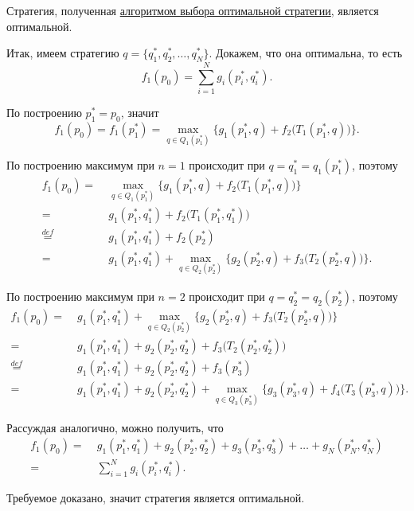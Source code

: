\fact

Стратегия, полученная \hyperref[def:opt_strategy]{алгоритмом выбора оптимальной стратегии}, является оптимальной.

\prooof


Итак, имеем стратегию $q = \{q_1^*, q_2^*, \dots, q_N^*\}$. Докажем, что она оптимальна, то есть
\[
f_1(p_0) = \sum_{i=1}^N g_i(p_i^*, q_i^*).
\]

По построению $p_1^* = p_0$, значит
\[
f_1(p_0) = f_1(p_1^*) = \max_{q \in Q_{1}(p_1^*)} \Big\{g_1(p_1^*, q) + f_{2}\big(T_{1}(p_1^*, q)\big)\Big\}.
\]

По построению максимум при $n=1$ происходит при $q = q_1^* = q_1(p_1^*)$, поэтому
\begin{align*}
	f_1(p_0) =& \; \max_{q \in Q_{1}(p_1^*)} \Big\{g_1(p_1^*, q) + f_{2}\big(T_{1}(p_1^*, q)\big)\Big\} \\
	=& \; g_1(p_1^*, q_1^*) + f_{2}\big(T_{1}(p_1^*, q_1^*)\big) \\
	\stackrel{def}{=}& \; g_1(p_1^*, q_1^*) + f_2(p_2^*) \\
	=& \; g_1(p_1^*, q_1^*) + \max_{q \in Q_{2}(p_2^*)} \Big\{g_2(p_2^*, q) + f_{3}\big(T_{2}(p_2^*, q)\big)\Big\}.
\end{align*}

По построению максимум при $n=2$ происходит при $q = q_2^* = q_2(p_2^*)$, поэтому
\begin{align*}
	f_1(p_0) =& \; g_1(p_1^*, q_1^*) + \max_{q \in Q_{2}(p_2^*)} \Big\{g_2(p_2^*, q) + f_{3}\big(T_{2}(p_2^*, q)\big)\Big\} \\
	=& \; g_1(p_1^*, q_1^*) + g_2(p_2^*, q_2^*) + f_{3}\big(T_{2}(p_2^*, q_2^*)\big) \\
	\stackrel{def}{=}& \; g_1(p_1^*, q_1^*) + g_2(p_2^*, q_2^*) + f_3(p_3^*) \\
	=& \; g_1(p_1^*, q_1^*) + g_2(p_2^*, q_2^*) + \max_{q \in Q_{3}(p_3^*)} \Big\{g_3(p_3^*, q) + f_{4}\big(T_{3}(p_3^*, q)\big)\Big\}.
\end{align*}

Рассуждая аналогично, можно получить, что
\begin{align*}
	f_1(p_0) =& \; g_1(p_1^*, q_1^*) + g_2(p_2^*, q_2^*) + g_3(p_3^*, q_3^*) + \dots + g_N(p_N^*, q_N^*) \\
	=& \; \sum_{i=1}^N g_i(p_i^*, q_i^*).
\end{align*}

Требуемое доказано, значит стратегия является оптимальной.

\remark

